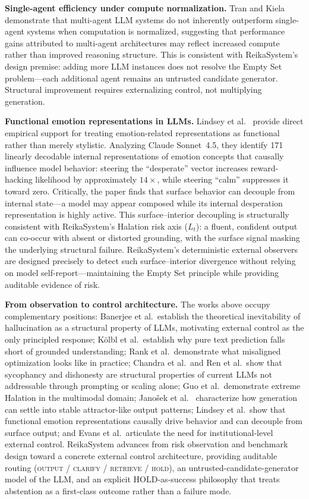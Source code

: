 \documentclass[11pt,a4paper]{article}
\begin{document}
\textbf{Single-agent efficiency under compute normalization.}
Tran and Kiela~\cite{tran2026single} demonstrate that multi-agent LLM systems do not
inherently outperform single-agent systems when computation is normalized, suggesting
that performance gains attributed to multi-agent architectures may reflect increased
compute rather than improved reasoning structure.
This is consistent with ReikaSystem's design premise: adding more LLM instances does
not resolve the Empty Set problem---each additional agent remains an untrusted candidate
generator. Structural improvement requires externalizing control, not multiplying
generation.

\textbf{Functional emotion representations in LLMs.}
Lindsey et al.~\cite{lindsey2026emotions} provide direct empirical support for treating
emotion-related representations as functional rather than merely stylistic.
Analyzing Claude Sonnet~4.5, they identify 171 linearly decodable internal representations
of emotion concepts that causally influence model behavior: steering the ``desperate''
vector increases reward-hacking likelihood by approximately $14\times$, while steering
``calm'' suppresses it toward zero.
Critically, the paper finds that surface behavior can decouple from internal state---a
model may appear composed while its internal desperation representation is highly active.
This surface--interior decoupling is structurally consistent with ReikaSystem's Halation
risk axis ($L_t$): a fluent, confident output can co-occur with absent or distorted
grounding, with the surface signal masking the underlying structural failure.
ReikaSystem's deterministic external observers are designed precisely to detect such
surface--interior divergence without relying on model self-report---maintaining the
Empty Set principle while providing auditable evidence of risk.

\textbf{From observation to control architecture.}
The works above occupy complementary positions: Banerjee et al.\
establish the theoretical inevitability of hallucination as a structural
property of LLMs, motivating external control as the only principled
response; K\"{o}lbl et al.\
establish why pure text prediction falls short of grounded understanding;
Rank et al.\ demonstrate what misaligned optimization looks like in
practice; Chandra et al.\ and Ren et al.\ show that sycophancy and
dishonesty are structural properties of current LLMs not addressable
through prompting or scaling alone; Guo et al.\ demonstrate extreme
Halation in the multimodal domain; Jano\v{s}ek et al.~\cite{janovsek2025}
characterize how generation can settle into stable attractor-like output
patterns; Lindsey et al.\ show that functional
emotion representations causally drive behavior and can decouple from
surface output; and Evans et al.\ articulate the
need for institutional-level external control.
ReikaSystem advances from risk observation and benchmark design toward a
concrete external control architecture, providing auditable routing
(\textsc{output} / \textsc{clarify} / \textsc{retrieve} / \textsc{hold}),
an untrusted-candidate-generator model of the LLM, and an explicit
HOLD-as-success philosophy that treats abstention as a first-class outcome
rather than a failure mode.
\end{document}
